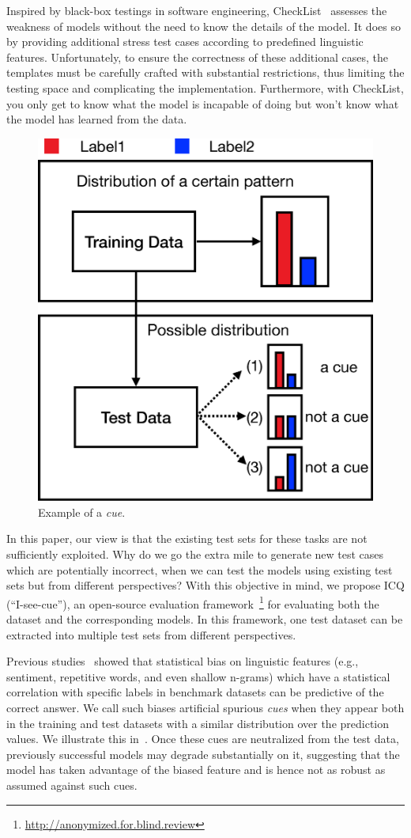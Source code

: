 Inspired by black-box testings in software engineering, 
CheckList~\cite{checklist2020acl} assesses the weakness of 
models without the need to know the details of the model. It does so by
providing additional stress test cases according to predefined 
linguistic features. Unfortunately, to ensure the correctness of
these additional cases, the templates must be carefully crafted
with substantial restrictions, thus limiting the testing space and
complicating the implementation. 
Furthermore, with CheckList, you only get to know what the model 
is incapable of doing but won't know what the model has 
learned from the data.

\begin{figure}[th]
\centering
\includegraphics[width=0.45\columnwidth]{picture/cue_def.eps}
\caption{Example of a {\em cue}. }
\label{fig:cue_def}
\end{figure}

In this paper, our view is that the existing test sets for these
tasks are not sufficiently exploited. Why do we go the extra mile to
generate new test cases which are potentially incorrect, when we can
test the models using existing test sets but from different perspectives?
With this objective in mind, we propose ICQ 
(``I-see-cue''), an open-source evaluation 
framework~\footnote{\url{http://anonymized.for.blind.review}} for 
evaluating both the dataset and the corresponding models. In this framework, 
one test dataset can be extracted into multiple test sets from different perspectives. 

Previous studies~\cite{gururangan2018annotation,sanchez2018behavior,poliak2018hypothesis} 
showed that statistical bias on linguistic features 
(e.g., sentiment, repetitive words, and even shallow n-grams)
which have a statistical correlation with specific labels 
in benchmark datasets can be predictive of the correct 
answer. We call such biases artificial spurious \textit{cues} when
they appear both in the training and test datasets with a similar distribution
over the prediction values.
We illustrate this in~. 
Once these cues are neutralized from the test data, 
previously successful models may degrade substantially
on it, suggesting that the model has taken advantage of 
the biased feature and is hence not as robust as assumed 
against such cues.

